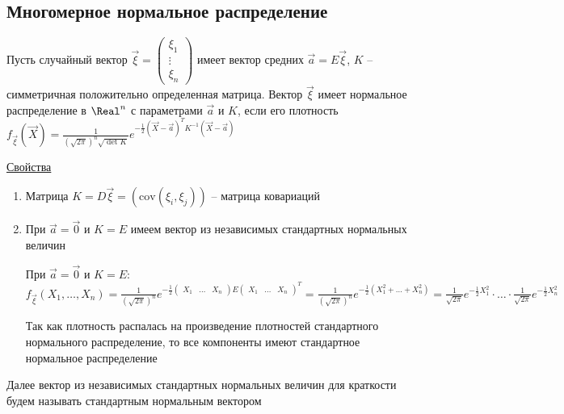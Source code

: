 \subsection{Многомерное нормальное распределение}

\Def Пусть случайный вектор $\vec \xi = \begin{pmatrix}\xi_1 \\ \vdots \\ \xi_n\end{pmatrix}$ имеет вектор средних 
$\vec a = E \vec \xi$, $K$ -- симметричная положительно определенная матрица. Вектор $\vec \xi$ 
имеет нормальное распределение в $\Real^n$ с параметрами $\vec a$ и $K$, если его плотность 
$f_{\vec \xi} (\vec X) = \frac{1}{\left(\sqrt{2\pi}\right)^n \sqrt{\det K}} e^{-\frac{1}{2} (\vec X - \vec a)^T K^{-1} (\vec X - \vec a)}$


\underline{Свойства}

\begin{enumerate}
    \item Матрица $K = D \vec \xi = \left(\mathrm{cov} (\xi_i, \xi_j)\right)$ -- матрица ковариаций

    \item При $\vec a = \vec 0$ и $K = E$ имеем вектор из независимых стандартных нормальных величин

    \begin{MyProof}
        При $\vec a = \vec 0$ и $K = E$: $f_{\vec \xi} (X_1, \dots, X_n) = \frac{1}{\left(\sqrt{2\pi}\right)^n} 
        e^{-\frac{1}{2} \begin{pmatrix}X_1 & \dots & X_n\end{pmatrix} E \begin{pmatrix}X_1 & \dots & X_n\end{pmatrix}^T} = 
        \frac{1}{\left(\sqrt{2\pi}\right)^n} e^{-\frac{1}{2} (X_1^2 + \dots + X_n^2)} = 
        \frac{1}{\sqrt{2\pi}} e^{-\frac{1}{2} X_1^2} \cdot \dots \cdot \frac{1}{\sqrt{2\pi}} e^{-\frac{1}{2} X_n^2}$

        Так как плотность распалась на произведение плотностей стандартного нормального распределение, то все компоненты имеют стандартное нормальное распределение
    \end{MyProof}
\end{enumerate}

Далее вектор из независимых стандартных нормальных величин для краткости будем называть стандартным нормальным вектором

